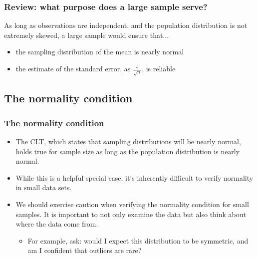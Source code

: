 \documentclass[notes,11pt, aspectratio=169]{beamer}
\begin{document}

\begin{frame}
\frametitle{Review: what purpose does a large sample serve?}

As long as observations are independent, and the population distribution is not extremely skewed, a large sample would ensure that...

\begin{itemize}

\item the sampling distribution of the mean is nearly normal

\item the estimate of the standard error, as $\frac{s}{\sqrt{n}}$, is reliable

\end{itemize}

\end{frame}


\subsection{The normality condition}


\begin{frame}
\frametitle{The normality condition}

\begin{itemize}

\item The CLT, which states that sampling distributions will be nearly normal, holds true for  sample size as long as the population distribution is nearly normal.

\pause

\item While this is a helpful special case, it's inherently difficult to verify normality in small data sets.

\pause

\item We should exercise caution when verifying the normality condition for small samples. It is important to not only examine the data but also think about where the data come from. 
\begin{itemize}
\item For example, ask: would I expect this distribution to be symmetric, and am I confident that outliers are rare?
\end{itemize}

\end{itemize}

\end{frame}
\end{document}
